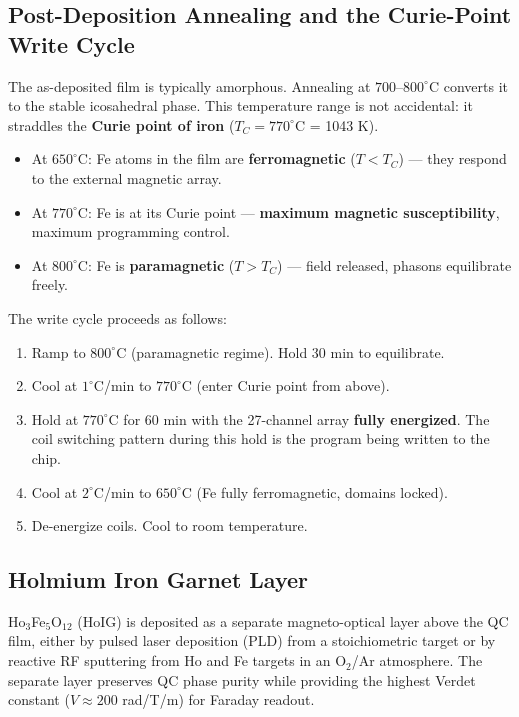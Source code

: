 \subsection{Post-Deposition Annealing and the Curie-Point Write Cycle}

The as-deposited film is typically amorphous. Annealing at $700$--$800^\circ$C converts it to the stable icosahedral phase. This temperature range is not accidental: it straddles the \textbf{Curie point of iron} ($T_C = 770^\circ$C = 1043 K).

\begin{itemize}
    \item At $650^\circ$C: Fe atoms in the film are \textbf{ferromagnetic} ($T < T_C$) --- they respond to the external magnetic array.
    \item At $770^\circ$C: Fe is at its Curie point --- \textbf{maximum magnetic susceptibility}, maximum programming control.
    \item At $800^\circ$C: Fe is \textbf{paramagnetic} ($T > T_C$) --- field released, phasons equilibrate freely.
\end{itemize}

The write cycle proceeds as follows:
\begin{enumerate}
    \item Ramp to $800^\circ$C (paramagnetic regime). Hold 30 min to equilibrate.
    \item Cool at $1^\circ$C/min to $770^\circ$C (enter Curie point from above).
    \item Hold at $770^\circ$C for 60 min with the 27-channel array \textbf{fully energized}. The coil switching pattern during this hold is the program being written to the chip.
    \item Cool at $2^\circ$C/min to $650^\circ$C (Fe fully ferromagnetic, domains locked).
    \item De-energize coils. Cool to room temperature.
\end{enumerate}

\subsection{Holmium Iron Garnet Layer}

Ho$_3$Fe$_5$O$_{12}$ (HoIG) is deposited as a separate magneto-optical layer above the QC film, either by pulsed laser deposition (PLD) from a stoichiometric target or by reactive RF sputtering from Ho and Fe targets in an O$_2$/Ar atmosphere. The separate layer preserves QC phase purity while providing the highest Verdet constant ($V \approx 200$ rad/T/m) for Faraday readout.


